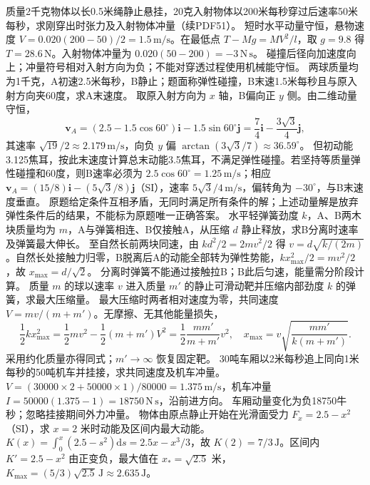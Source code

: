 \problemtext 质量2千克物体以长0.5米绳静止悬挂，20克入射物体以200米每秒穿过后速率50米每秒，求刚穿出时张力及入射物体冲量（续PDF51）。
\workings 短时水平动量守恒，悬物速度 $V=0.020(200-50)/2=1.5\,\mathrm{m/s}$。在最低点 $T-Mg=MV^2/l$，取 $g=9.8$ 得 $T=28.6\,\mathrm N$。入射物体冲量为 $0.020(50-200)=-3\,\mathrm{N\,s}$。
\crosscheck 碰撞后径向加速度向上；冲量符号相对入射方向为负；不能对穿透过程使用机械能守恒。
\problemtext 两球质量均为1千克，A初速2.5米每秒，B静止；题面称弹性碰撞，B末速1.5米每秒且与原入射方向夹60度，求A末速度。
\workings 取原入射方向为 $x$ 轴，B偏向正 $y$ 侧。由二维动量守恒，
\[
\bm v_A=(2.5-1.5\cos60^\circ)\bm i-1.5\sin60^\circ\bm j
=\frac74\bm i-\frac{3\sqrt3}{4}\bm j,
\]
其速率 $\sqrt{19}/2\approx2.179\,\mathrm{m/s}$，向负 $y$ 偏 $\arctan(3\sqrt3/7)\approx36.59^\circ$。
但初动能3.125焦耳，按此末速度计算总末动能3.5焦耳，不满足弹性碰撞。若坚持等质量弹性碰撞和60度，则B速率必须为 $2.5\cos60^\circ=1.25\,\mathrm{m/s}$；相应 $\bm v_A=(15/8)\bm i-(5\sqrt3/8)\bm j$（SI），速率 $5\sqrt3/4\,\mathrm{m/s}$，偏转角为 $-30^\circ$，与B末速度垂直。
\crosscheck 原题给定条件互相矛盾，无同时满足所有条件的解；上述动量解是放弃弹性条件后的结果，不能标为原题唯一正确答案。
\problemtext 水平轻弹簧劲度 $k$，A、B两木块质量均为 $m$，A与弹簧相连、B仅接触A，从压缩 $d$ 静止释放，求B分离时速率及弹簧最大伸长。
\workings 至自然长前两块同速，由 $kd^2/2=2mv^2/2$ 得 $v=d\sqrt{k/(2m)}$。自然长处接触力归零，B脱离后A的动能全部转为弹性势能，$kx_{\max}^2/2=mv^2/2$，故 $x_{\max}=d/\sqrt2$。
\crosscheck 分离时弹簧不能通过接触拉B；B此后匀速，能量需分阶段计算。
\problemtext 质量 $m$ 的球以速率 $v$ 进入质量 $m'$ 的静止可滑动靶并压缩内部劲度 $k$ 的弹簧，求最大压缩量。
\workings 最大压缩时两者相对速度为零，共同速度 $V=mv/(m+m')$。无摩擦、无其他能量损失，
\[
\frac12kx_{\max}^2=\frac12mv^2-\frac12(m+m')V^2
=\frac12\frac{mm'}{m+m'}v^2,
\quad x_{\max}=v\sqrt{\frac{mm'}{k(m+m')}}.
\]
\crosscheck 采用约化质量亦得同式；$m'\to\infty$ 恢复固定靶。
\problemtext 30吨车厢以2米每秒追上同向1米每秒的50吨机车并挂接，求共同速度及机车冲量。
\workings $V=(30000\times2+50000\times1)/80000=1.375\,\mathrm{m/s}$，机车冲量 $I=50000(1.375-1)=18750\,\mathrm{N\,s}$，沿前进方向。
\crosscheck 车厢动量变化为负18750牛秒；忽略挂接期间外力冲量。
\problemtext 物体由原点静止开始在光滑面受力 $F_x=2.5-x^2$（SI），求 $x=2$ 米时动能及区间内最大动能。
\workings $K(x)=\int_0^x(2.5-s^2)\mathrm ds=2.5x-x^3/3$，故 $K(2)=7/3\,\mathrm J$。区间内 $K'=2.5-x^2$ 由正变负，最大值在 $x_*=\sqrt{2.5}$ 米，$K_{\max}=(5/3)\sqrt{2.5}\,\mathrm J\approx2.635\,\mathrm J$。
